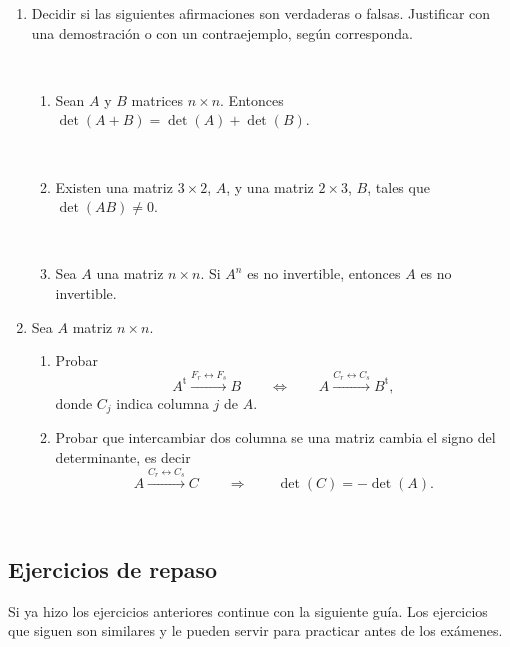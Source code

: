 \documentclass[12pt]{amsart}
\begin{document}
\begin{enumerate}
\

\item Decidir si las siguientes afirmaciones son verdaderas o falsas. Justificar con una demostraci\' on o con un contraejemplo, seg\' un corresponda.

\

\begin{enumerate}
\item Sean $A$ y $B$ matrices $n \times n$. Entonces $\det(A + B) = \det (A) + \det(B)$.

\

\item Existen una matriz $3\times 2$, $A$, y una matriz $2\times 3$, $B$, tales que $\det(AB) \neq 0$.

\

\item Sea $A$ una matriz $n\times n$. Si $A^n$ es no invertible, entonces $A$ es no invertible.
\end{enumerate}

\item Sea $A$ matriz $n \times n$.
\begin{enumerate}
	\item Probar 
	 $$ A^{\operatorname t} \stackrel{{F_r \leftrightarrow F_s}}{\longrightarrow} B  \qquad \Leftrightarrow   \qquad 
	A \stackrel{{C_r \leftrightarrow C_s}}{\longrightarrow} B^{\operatorname t},$$
	donde $C_j$ indica columna $j$ de $A$.
	\item Probar que intercambiar dos columna se una matriz cambia el signo del determinante, es decir
	 $$  A \stackrel{{C_r \leftrightarrow C_s}}{\longrightarrow}C \qquad \Rightarrow   \qquad \det(C) = -\det(A).
	$$
	
\end{enumerate} 





\end{enumerate}



\

\subsection*{Ejercicios de repaso}
Si ya hizo los ejercicios anteriores continue con la siguiente gu\'ia. Los ejercicios que siguen son similares y le pueden servir para practicar antes de los ex\'amenes.

\
\end{document}
